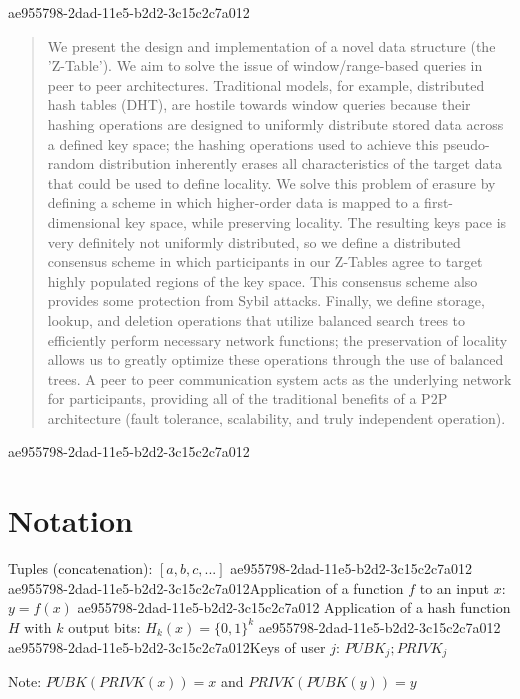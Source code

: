 \documentclass[12pt]{article}
\begin{document}
\maketitle

ae955798-2dad-11e5-b2d2-3c15c2c7a012\begin{abstract}
We present the design and implementation of a novel data structure (the 'Z-Table'). We aim to solve the issue of window/range-based queries in peer to peer architectures. Traditional models, for example,  distributed hash tables (DHT), are hostile towards window queries because their hashing operations are designed to uniformly distribute stored data across a defined key space; the hashing operations used to achieve this pseudo-random distribution inherently erases all characteristics of the target data that could be used to define locality. We solve this problem of erasure by defining a scheme in which higher-order data is mapped to a first-dimensional key space, while preserving locality. The resulting keys pace is very definitely not uniformly distributed, so we define a distributed consensus scheme in which participants in our Z-Tables agree to target highly populated regions of the key space. This consensus scheme also provides some protection from Sybil attacks. Finally, we define storage, lookup, and deletion operations that utilize balanced search trees to efficiently perform necessary network functions; the preservation of locality allows us to greatly optimize these operations through the use of balanced trees. A peer to peer communication system acts as the underlying network for participants, providing all of the traditional benefits of a P2P architecture (fault tolerance, scalability, and truly independent operation).
\end{abstract}

ae955798-2dad-11e5-b2d2-3c15c2c7a012\section{Notation}

Tuples (concatenation): $[a,b,c,...]$
ae955798-2dad-11e5-b2d2-3c15c2c7a012
ae955798-2dad-11e5-b2d2-3c15c2c7a012Application of a function $f$ to an input $x$: $y=f(x)$
ae955798-2dad-11e5-b2d2-3c15c2c7a012
Application of a hash function $H$ with $k$ output bits: $H_{k}(x) = \{0,1\}^k$
ae955798-2dad-11e5-b2d2-3c15c2c7a012
ae955798-2dad-11e5-b2d2-3c15c2c7a012Keys of user $j$: $ PUBK_j; PRIVK_j $

Note: $PUBK(PRIVK(x)) = x$ and $PRIVK(PUBK(y)) = y$~
\end{document}
